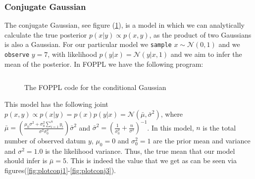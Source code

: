\documentclass[twoside]{article}
\begin{document}
\subsubsection{Conjugate Gaussian}
The conjugate Gaussian, see figure (\ref{fig:conga}), is a model in which we can analytically calculate the true posterior $p(x | y) \propto p(x,y) $, as the product of two Gaussians is also a Gaussian. For our particular model we \texttt{sample} $x \sim \mathcal{N}(0, 1)$ and we \texttt{observe} $y = 7$, with likelihood $p(y|x) = \mathcal{N}(y | x, 1)$ and we aim to infer the mean of the posterior. In FOPPL we have the following program:
\inputminted{clojure}{code/conjugategauss.clj}
\begin{figure}[ht]
	\label{fig:conga}
	\begin{center}
		
	\end{center}
	\caption{The FOPPL code for the conditional Gaussian}
\end{figure}
This model has the following joint $ p(x,y) \propto p(x|y) = p(x)p(y| x) = \mathcal{N}(\bar{\mu}, \bar{\sigma}^{2})$, where $\bar{\mu} = \left(\frac{\mu_{0}\sigma^{2} + \sigma^{2}_{0}\sum_{i=1}^{n}y_{i}}{\sigma^{2}\sigma^{2}_{0}}\right) \bar{\sigma}^{2}$ and $\bar{\sigma}^{2} = \left(\frac{1}{\sigma^{2}_{0}} + \frac{n}{\sigma^{2}}\right)^{-1} $. In this model, $n$ is the total number of observed datum $y$, $\mu_{0} = 0 $ and $\sigma_{0}^{2} = 1$ are the prior mean and variance and $\sigma^{2} = 1.0 $ is the likelihood variance. Thus, the true mean that our model should infer is $\bar{\mu} = 5$. This is indeed the value that we get as can be seen via figures(\ref{fig:plotconj1}-\ref{fig:plotconj3}).
\end{document}
